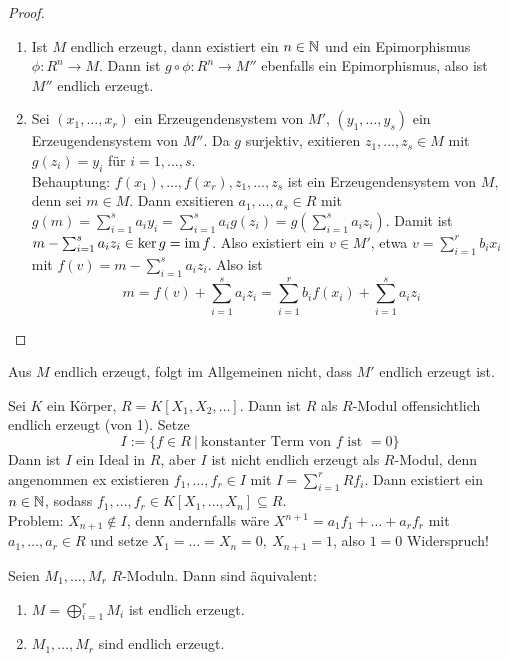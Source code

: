 \begin{proof}
	\begin{enumerate}[label=\alph*)]
		\item Ist $M$ endlich erzeugt, dann existiert ein $n\in \mathbb{N}$ und ein Epimorphismus $\phi:R^n \to M$. Dann ist $g\circ \phi:R^n \to M''$ ebenfalls ein Epimorphismus, also ist $M''$ endlich erzeugt.
		\item Sei $(x_1, \ldots, x_r)$ ein Erzeugendensystem von $M'$, $(y_1, \ldots, y_s)$ ein Erzeugendensystem von $M''$. Da $g$ surjektiv, exitieren $z_1, \ldots, z_s\in M$ mit $g(z_i) = y_i$ für $i=1, \ldots, s$. \\
		Behauptung: $f(x_1), \ldots, f(x_r), z_1, \ldots, z_s$ ist ein Erzeugendensystem von $M$, denn sei $m\in M$. Dann exsitieren $a_1, \ldots, a_s\in R$ mit $g(m) = \sum_{i=1}^s a_i y_i = \sum_{i=1}^s a_i g(z_i) = g(\sum_{i=1}^s a_i z_i)$. Damit ist $m- \sum_{i=1}^s a_i z_i \in \ker g = \operatorname{im} f$. Also existiert ein $v\in M'$, etwa $v= \sum_{i=1}^r b_i x_i$ mit $f(v) = m - \sum_{i=1}^s a_i z_i $. Also ist 
		$$m=f(v) + \sum_{i=1}^sa_i z_i = \sum_{i=1}^r b_i f(x_i) + \sum_{i=1}^s a_i z_i$$ 
	\end{enumerate}
\end{proof}
\begin{anm}
	Aus $M$ endlich erzeugt, folgt im Allgemeinen nicht, dass $M'$ endlich erzeugt ist.
\end{anm}
\begin{bsp}
	Sei $K$ ein Körper, $R=K[X_1, X_2, \ldots]$. Dann ist $R$ als $R$-Modul offensichtlich endlich erzeugt (von 1). Setze $$I:= \{f\in R \ | \ \text{konstanter Term von } f \text{ ist } =0\}$$
	Dann ist $I$ ein Ideal in $R$, aber $I$ ist nicht endlich erzeugt als $R$-Modul, denn angenommen ex existieren $f_1, \ldots, f_r\in I$ mit $I = \sum_{i=1}^rRf_i$. Dann existiert ein $n\in \mathbb{N}$, sodass $f_1, \ldots, f_r\in K[X_1, \ldots, X_n] \subseteq R$. \\
	Problem: $X_{n+1} \notin I$, denn andernfalls wäre $X^{n+1} = a_1 f_1 + \ldots + a_rf_r$ mit $a_1, \ldots, a_r \in R$ und setze $X_1 = \ldots = X_n = 0, \ X_{n+1} = 1$, also $1=0$ Widerspruch!		
\end{bsp}
\begin{bem}\label{bem2.7}
	Seien $M_1, \ldots, M_r$ $R$-Moduln. Dann sind äquivalent:
	\begin{enumerate}[label=\roman*)]
		\item $M= \bigoplus_{i=1}^r M_i$ ist endlich erzeugt.
		\item $M_1, \ldots, M_r$ sind endlich erzeugt.
	\end{enumerate}
\end{bem}
